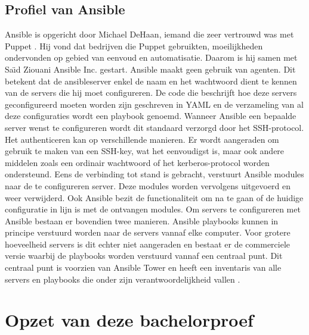 \subsection{Profiel van Ansible}
Ansible is opgericht door Michael DeHaan, iemand die zeer vertrouwd was met Puppet \autocite{ansiblefordevops}. Hij vond dat bedrijven die Puppet gebruikten, moeilijkheden ondervonden op gebied van eenvoud en automatisatie. Daarom is hij samen met Sa{\"\i}d Ziouani Ansible Inc. gestart. 
Ansible maakt geen gebruik van agenten. Dit betekent dat de ansibleserver enkel de naam en het wachtwoord dient te kennen van de servers die hij moet configureren. De code die beschrijft hoe deze servers geconfigureerd moeten worden zijn geschreven in YAML en de verzameling van al deze configuraties wordt een playbook genoemd. Wanneer Ansible een bepaalde server wenst te configureren wordt dit standaard verzorgd door het SSH-protocol. Het authenticeren kan op verschillende manieren. Er wordt aangeraden om gebruik te maken van een SSH-key, wat het eenvoudigst is, maar ook andere middelen zoals een ordinair wachtwoord of het kerberos-protocol worden ondersteund. Eens de verbinding tot stand is gebracht, verstuurt Ansible modules naar de te configureren server. Deze modules worden vervolgens uitgevoerd en weer verwijderd. Ook Ansible bezit de functionaliteit om na te gaan of de huidige configuratie in lijn is met de ontvangen modules. Om servers te configureren met Ansible bestaan er bovendien twee manieren. Ansible playbooks kunnen in principe verstuurd worden naar de servers vannaf elke computer. Voor grotere hoeveelheid servers is dit echter niet aangeraden en bestaat er de commerciele versie waarbij de playbooks worden verstuurd vannaf een centraal punt. Dit centraal punt is voorzien van Ansible Tower en heeft een inventaris van alle servers en playbooks die onder zijn verantwoordelijkheid vallen \autocite{ansibledoc}.







\section{Opzet van deze bachelorproef}
\label{sec:opzet-bachelorproef}

